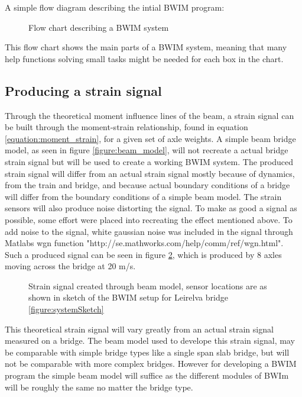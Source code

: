 A simple flow diagram describing the intial BWIM program:
\begin{figure}[H]
	\begin{adjustbox}{center}
		
	\end{adjustbox}
	\caption{Flow chart describing a BWIM system}
	\label{flowChart}
\end{figure}
This flow chart shows the main parts of a BWIM system, meaning that many help functions solving small tasks might be needed for each box in the chart.
\subsection{Producing a strain signal}
Through the theoretical moment influence lines of the beam, a strain signal can be built through the moment-strain relationship, found in equation \ref{equation:moment_strain}, for a given set of axle weights. A simple beam bridge model, as seen in figure \ref{figure:beam_model}, will not recreate a actual bridge strain signal but will be used to create a working BWIM system. The produced strain signal will differ from an actual strain signal mostly because of dynamics, from the train and bridge, and because actual boundary conditions of a bridge will differ from the boundary conditions of a simple beam model. The strain sensors will also produce noise distorting the signal.
To make as good a signal as possible, some effort were placed into recreating the effect mentioned above. To add noise to the signal, white gaussian noise was included in the signal through Matlabs wgn function "http://se.mathworks.com/help/comm/ref/wgn.html". Such a produced signal can be seen in figure \ref{fig:strainCreated}, which is produced by 8 axles moving across the bridge at 20 m/s.

\begin{figure}[H]
	\begin{adjustbox}{center}
		
	\end{adjustbox}
	\caption{Strain signal created through beam model, sensor locations are as shown in sketch of the BWIM setup for Leirelva bridge \ref{figure:systemSketch}}
	\label{fig:strainCreated}
\end{figure}

This theoretical strain signal will vary greatly from an actual strain signal measured on a bridge. The beam model used to develope this strain signal, may be comparable with simple bridge types like a single span slab bridge, but will not be comparable with more complex bridges.
However for developing a BWIM program the simple beam model will suffice as the different modules of BWIm will be roughly the same no matter the bridge type.
